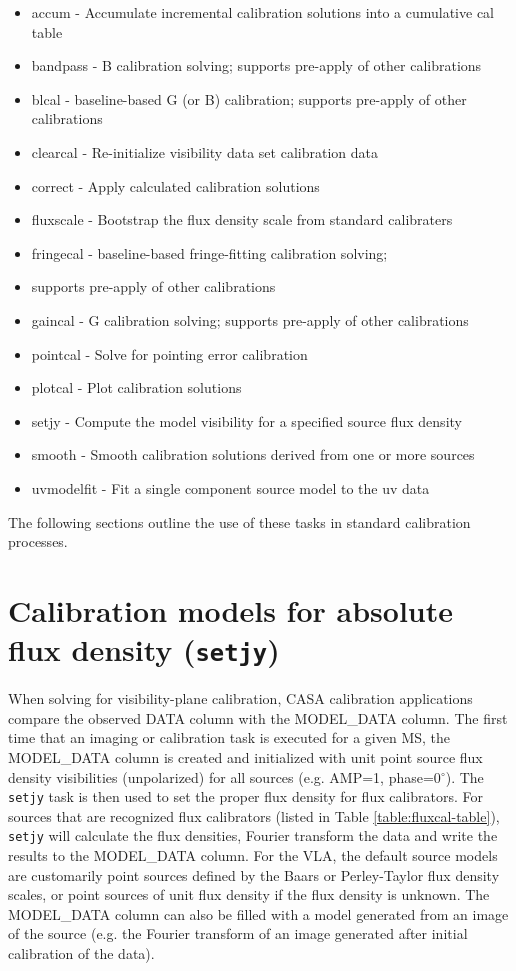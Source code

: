 \begin{itemize}
   \item accum - Accumulate incremental calibration solutions into a cumulative cal table
   \item bandpass - B calibration solving; supports pre-apply of other calibrations
   \item blcal - baseline-based G (or B) calibration; supports pre-apply of other calibrations
   \item clearcal - Re-initialize visibility data set calibration data
   \item correct - Apply calculated calibration solutions
   \item fluxscale - Bootstrap the flux density scale from standard calibraters
   \item fringecal - baseline-based fringe-fitting calibration solving;
   \item supports pre-apply of other calibrations 
   \item gaincal - G calibration solving; supports pre-apply of other calibrations
   \item pointcal - Solve for pointing error calibration
   \item plotcal - Plot calibration solutions
   \item setjy - Compute the model visibility for a specified source flux density
   \item smooth - Smooth calibration solutions derived from one or more sources
   \item uvmodelfit - Fit a single component source model to the uv data 
\end{itemize}

The following sections outline the use of these tasks in standard calibration
processes.

\section{Calibration models for absolute flux density ({\tt setjy})}
\label{section:synth.cal.models}

When solving for visibility-plane calibration, CASA calibration applications
compare the observed DATA column with the MODEL\_DATA column.
The first time that an imaging or calibration task is executed for a
given MS, the MODEL\_DATA column is created and initialized with unit
point source flux density visibilities (unpolarized) for all sources
(e.g. AMP=1, phase=0$^{\circ}$).  The {\tt setjy} task is
then used to set the proper flux density for flux calibrators.  For
sources that are recognized flux calibrators (listed in Table
\ref{table:fluxcal-table}), {\tt setjy} will calculate the flux
densities, Fourier transform the data and write the results to the
MODEL\_DATA column.  For the VLA, the default source models are
customarily point sources defined by the Baars or Perley-Taylor flux
density scales, or point sources of unit flux density if the flux
density is unknown.  The MODEL\_DATA column can also be filled with a
model generated from an image of the source (e.g. the Fourier
transform of an image generated after initial calibration of the
data).


